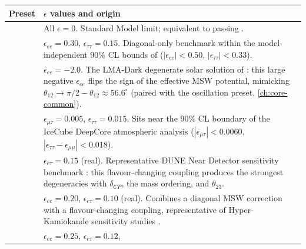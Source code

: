 \begin{implbox}
\begin{center}
\small
\begin{tabular}{@{}ll@{}}
\toprule
Preset & $\epsilon$ values and origin \\
\midrule
\parbox[t]{3.2cm}{} &
  \parbox[t]{9.4cm}{All $\epsilon=0$. Standard Model limit; equivalent to
  passing .} \\[10pt]
\parbox[t]{3.2cm}{} &
  \parbox[t]{9.4cm}{$\epsilon_{ee}=0.30$, $\epsilon_{\tau\tau}=0.15$.
  Diagonal-only benchmark within the model-independent 90\% CL bounds of
  \textcite{BiggioBlennowFM2009} ($|\epsilon_{ee}|<0.50$,
  $|\epsilon_{\tau\tau}|<0.33$).} \\[18pt]
\parbox[t]{3.2cm}{} &
  \parbox[t]{9.4cm}{$\epsilon_{ee}=-2.0$. The LMA-Dark degenerate solar
  solution of \textcite{Esteban2018LMADark}: this large negative
  $\epsilon_{ee}$ flips the sign of the effective MSW potential, mimicking
  $\theta_{12}\to\pi/2-\theta_{12}\approx56.6^\circ$ (paired with the
   oscillation preset,
  \cref{ch:core-common}).} \\[24pt]
\parbox[t]{3.2cm}{} &
  \parbox[t]{9.4cm}{$\epsilon_{\mu\tau}=0.005$, $\epsilon_{\tau\tau}=0.015$.
  Sits near the 90\% CL boundary of the IceCube DeepCore atmospheric
  analysis \parencite{IceCube2022NSI}
  ($|\epsilon_{\mu\tau}|<0.0060$, $|\epsilon_{\tau\tau}-\epsilon_{\mu\mu}|<0.018$).} \\[18pt]
\parbox[t]{3.2cm}{} &
  \parbox[t]{9.4cm}{$\epsilon_{e\tau}=0.15$ (real). Representative DUNE
  Near Detector sensitivity benchmark \parencite{DUNE2021BSM}: this
  flavour-changing coupling produces the strongest degeneracies with
  $\delta_{CP}$, the mass ordering, and $\theta_{23}$.} \\[18pt]
\parbox[t]{3.2cm}{} &
  \parbox[t]{9.4cm}{$\epsilon_{ee}=0.20$, $\epsilon_{e\tau}=0.10$ (real).
  Combines a diagonal MSW correction with a flavour-changing coupling,
  representative of Hyper-Kamiokande sensitivity studies
  \parencite{HyperK2015Proposal}.} \\[18pt]
\parbox[t]{3.2cm}{} &
  \parbox[t]{9.4cm}{$\epsilon_{ee}=0.25$, $\epsilon_{e\tau}=0.12$,
}
\end{tabular}
\end{center}
\end{implbox}
